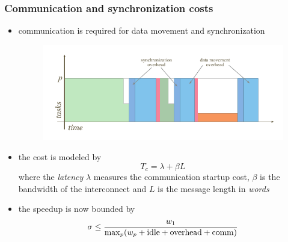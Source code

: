 \begin{frame}[fragile]
%
  \frametitle{Communication and synchronization costs}
%
  \begin{itemize}
%
  \item communication is required for data movement and synchronization
    \begin{figure}
      \centering
      \includegraphics[scale=0.75]{figures/reduction-comsync.pdf}
    \end{figure}
%
  \item the cost is modeled by
    \[
    T_{c} = \lambda + \beta L
    \]
    where the {\em latency} $\lambda$ measures the communication startup cost, $\beta$ is the
    bandwidth of the interconnect and $L$ is the message length in {\em words} 
%
  \item the speedup is now bounded by
    \[
    \sigma \leq \frac{w_{1}}{{\rm max}_{p}(w_{p} + {\rm idle} + {\rm overhead} + {\rm comm})}
    \]
%      
  \end{itemize}
%
\end{frame}

